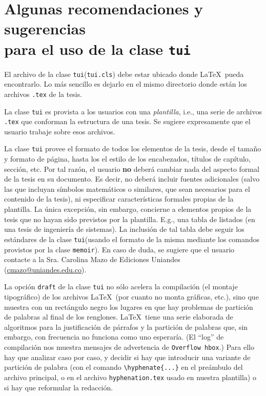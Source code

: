 \documentclass[11pt,
              article,
              oneside
              ]{memoir}
\newcommand*{\comando}[1]{\texttt{#1}}
\newcommand*{\paquete}[1]{\texttt{\color{NavyBlue}#1}\xspace}
\newcommand*{\tui}{{\normalfont\paquete{tui}}\xspace}
\newcommand*{\MEMOIR}{\paquete{memoir}}
\begin{document}
\section[Algunas recomendaciones y sugerencias]{Algunas recomendaciones y sugerencias\\ para el uso de la clase \tui}
\begin{compactenum}
  \item El archivo de la clase \tui (\comando{tui.cls}) debe estar ubicado donde \LaTeX\ pueda encontrarlo. Lo más sencillo es dejarlo en el mismo directorio donde están los archivos \comando{.tex} de la tesis.
  \item La clase \tui es provista a los usuarios con una \textit{plantilla}, i.e., una serie de archivos \comando{.tex} que conforman la estructura de una tesis. Se sugiere expresamente que el usuario trabaje sobre esos archivos.
  \item La clase \tui provee el formato de todos los elementos de la tesis, desde el tamaño y formato de página, hasta los el estilo de los encabezados, títulos de capítulo, sección, etc. Por tal razón, el usuario \textbf{no} deberá cambiar nada del aspecto formal de la tesis en su documento. Es decir, no deberá incluir fuentes adicionales (salvo las que incluyan símbolos matemáticos o similares, que sean necesarios para el contenido de la tesis), ni especificar características formales propias de la plantilla. La única excepción, sin embargo, concierne a elementos propios de la tesis que no hayan sido previstos por la plantilla.  E.g., una tabla de listados (en una tesis de ingeniería de sistemas). La inclusión de tal tabla debe seguir los estándares de la clase \tui (usando el formato de la misma mediante los comandos provistos por la clase \MEMOIR). En caso de duda, se sugiere que el usuario contacte a la Sra. Carolina Mazo de Ediciones Uniandes (\url{cmazo@uniandes.edu.co}).
  \item La opción \comando{draft} de la clase \tui no sólo acelera la compilación (el montaje tipográfico) de los archivos \LaTeX\ (por cuanto no monta gráficas, etc.), sino que muestra con un rectángulo negro los lugares en que hay problemas de partición de palabras al final de los renglones. \LaTeX\ tiene una serie elaborada de algoritmos para la justificación de párrafos y la partición de palabras que, sin embargo, con frecuencia no funciona como uno esperaría. (El \enquote{log} de compilación nos muestra mensajes de advertencia de \comando{Overflow hbox}.) Para ello hay que analizar caso por caso, y decidir si hay que introducir una variante de partición de palabra (con el comando \verb+\hyphenate{...}+ en el preámbulo del archivo principal, o en el archivo \texttt{hyphenation.tex} usado en nuestra plantilla) o si hay que reformular la redacción.

\end{compactenum}
\end{document}
